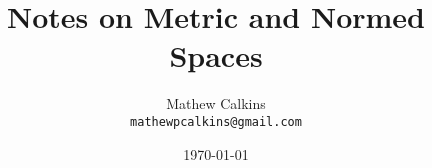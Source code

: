 \documentclass[12 pt]{article}
\numberwithin{equation}{section}
\begin{document}
\title{Notes on Metric and Normed Spaces}
\author{Mathew Calkins\\
  \texttt{mathewpcalkins@gmail.com}}

\date{\today}

\maketitle

\end{document}
